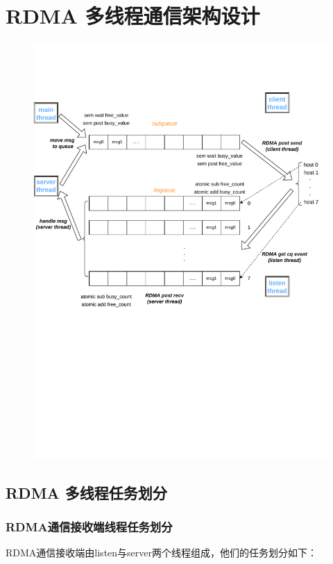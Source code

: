 {    \section{RDMA 多线程通信架构设计}

    \begin{figure}[H]
        \centering
        \includegraphics[width=1.1\textwidth]{Img/RDMA_design.pdf}
    \end{figure}


    \subsection{RDMA 多线程任务划分}

    \subsubsection{RDMA通信接收端线程任务划分}
    RDMA通信接收端由listen与server两个线程组成，他们的任务划分如下：

}
